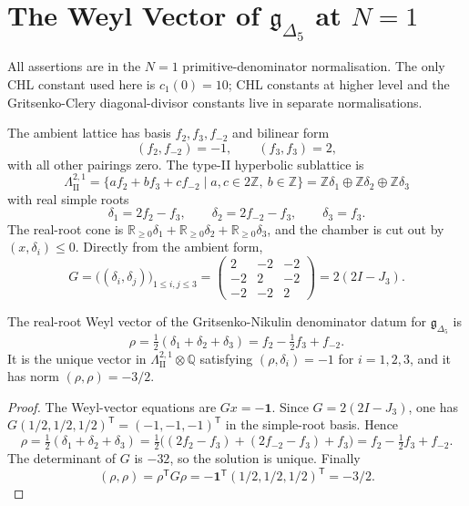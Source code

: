\providecommand{\kBKM}{\kappa_{\mathrm{BKM}}}
\providecommand{\LII}{\Lambda^{2,1}_{\mathrm{II}}}
\providecommand{\gDelta}{\mathfrak{g}_{\Delta_5}}
\providecommand{\Dfive}{D_5}

\section*{The Weyl Vector of \texorpdfstring{$\mathfrak g_{\Delta_5}$}{g Delta5} at \texorpdfstring{$N=1$}{N=1}}

All assertions are in the $N=1$ primitive-denominator normalisation.
The only CHL constant used here is $c_1(0)=10$; CHL constants at
higher level and the Gritsenko-Clery diagonal-divisor constants live in
separate normalisations.

The ambient lattice has basis $f_2,f_3,f_{-2}$ and bilinear form
\[
  (f_2,f_{-2})=-1,\qquad (f_3,f_3)=2,
\]
with all other pairings zero.  The type-II hyperbolic sublattice is
\[
  \LII
  =
  \{a f_2+b f_3+c f_{-2}\mid a,c\in 2\mathbb Z,\ b\in\mathbb Z\}
  =
  \mathbb Z\delta_1\oplus\mathbb Z\delta_2\oplus\mathbb Z\delta_3
\]
with real simple roots
\[
  \delta_1=2f_2-f_3,\qquad
  \delta_2=2f_{-2}-f_3,\qquad
  \delta_3=f_3.
\]
The real-root cone is
$\mathbb R_{\geq0}\delta_1+\mathbb R_{\geq0}\delta_2+
\mathbb R_{\geq0}\delta_3$, and the chamber is cut out by
$(x,\delta_i)\leq0$.  Directly from the ambient form,
\[
  G=\bigl((\delta_i,\delta_j)\bigr)_{1\leq i,j\leq 3}
  =
  \begin{pmatrix}
  2&-2&-2\\
  -2&2&-2\\
  -2&-2&2
  \end{pmatrix}
  =
  2(2I-J_3).
\]

\begin{proposition}
\label{prop:weyl-vector-delta5-N1}
The real-root Weyl vector of the Gritsenko-Nikulin denominator datum
for $\gDelta$ is
\[
  \rho=\tfrac12(\delta_1+\delta_2+\delta_3)
       =f_2-\tfrac12 f_3+f_{-2}.
\]
It is the unique vector in $\LII\otimes\mathbb Q$ satisfying
$(\rho,\delta_i)=-1$ for $i=1,2,3$, and it has norm
$(\rho,\rho)=-3/2$.
\end{proposition}

\begin{proof}
The Weyl-vector equations are $Gx=-\mathbf 1$.  Since
$G=2(2I-J_3)$, one has
$G(1/2,1/2,1/2)^{\mathsf T}=(-1,-1,-1)^{\mathsf T}$ in the
simple-root basis.  Hence
\[
  \rho=\tfrac12(\delta_1+\delta_2+\delta_3)
       =\tfrac12\bigl((2f_2-f_3)+(2f_{-2}-f_3)+f_3\bigr)
       =f_2-\tfrac12 f_3+f_{-2}.
\]
The determinant of $G$ is $-32$, so the solution is unique.  Finally
\[
  (\rho,\rho)
  =
  \rho^{\mathsf T}G\rho
  =
  -\mathbf 1^{\mathsf T}(1/2,1/2,1/2)^{\mathsf T}
  =
  -3/2.
\]
\end{proof}

